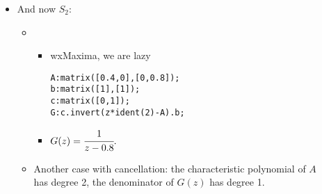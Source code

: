 \begin{frame}[fragile]
\myPause
 \begin{itemize}[<+-| alert@+>]
 \item And now $S_2$:
       \begin{itemize}
       \item[] \begin{itemize}[<+-| alert@+>]
               \item[] wxMaxima, we are lazy \smiley
                       \begin{verbatim}
A:matrix([0.4,0],[0,0.8]);
b:matrix([1],[1]);
c:matrix([0,1]);
G:c.invert(z*ident(2)-A).b;
                       \end{verbatim}
               \item[] \vspace{1mm}
                    $ G(z) = \cfrac{1}{z-0.8}.
                    $
               \end{itemize}
               \item \vspace{3mm}Another case with cancellation: the characteristic polynomial of $A$\\
                     has degree 2, the denominator of $G(z)$ has degree 1.
       \end{itemize}
 \end{itemize}
\end{frame}



